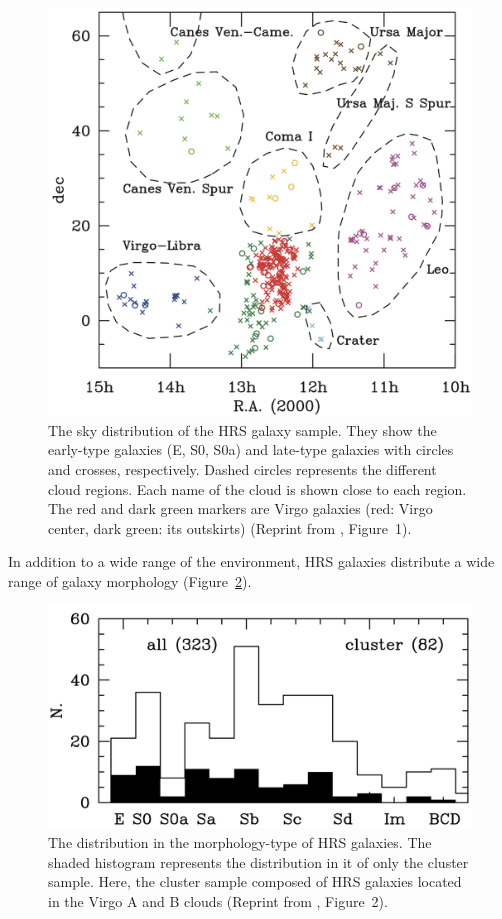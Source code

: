 \begin{figure}[htbp]
	\centering
	\includegraphics[width=.7\linewidth]{Chapter_3/Figures/Boselli2010_Figure1.png}
    \caption[The sky distribution of galaxies in HRS catalog]{\label{fig:Boselli2010_figure1}
        The sky distribution of the HRS galaxy sample.
        They show the early-type galaxies (E, S0, S0a) and late-type galaxies with circles and crosses, respectively.
        Dashed circles represents the different cloud regions. Each name of the cloud is shown close to each region.
        The red and dark green markers are Virgo galaxies (red: Virgo center, dark green: its outskirts)
        (Reprint from \citealt{Boselli2010}, Figure~1).
    }
\end{figure}

In addition to a wide range of the environment, HRS galaxies distribute a wide range of galaxy morphology (Figure~\ref{fig:Boselli2010_figure2}).

\begin{figure}[htbp]
	\centering
	\includegraphics[width=.8\linewidth]{Chapter_3/Figures/Boselli2010_Figure2.png}
    \caption[The morphology distribution of HRS samples]{\label{fig:Boselli2010_figure2}
        The distribution in the morphology-type of HRS galaxies.
        The shaded histogram represents the distribution in it of only the cluster sample.
        Here, the cluster sample composed of HRS galaxies located in the Virgo A and B clouds
        (Reprint from \citealt{Boselli2010}, Figure~2).
    }
\end{figure}

